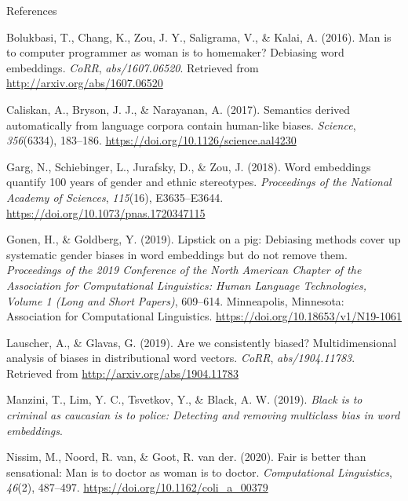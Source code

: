 \documentclass[10pt,ignorenonframetext,x11names, dvipsnames, bibspacing,natbib]{beamer}
\begin{document}
\begin{frame}{References}

\tiny

\hypertarget{refs}{}
\hypertarget{ref-Bolukbasi2016Man}{}
Bolukbasi, T., Chang, K., Zou, J. Y., Saligrama, V., \& Kalai, A.
(2016). Man is to computer programmer as woman is to homemaker?
Debiasing word embeddings. \emph{CoRR}, \emph{abs/1607.06520}. Retrieved
from \url{http://arxiv.org/abs/1607.06520}

\hypertarget{ref-Caliskan2017semanticsBiases}{}
Caliskan, A., Bryson, J. J., \& Narayanan, A. (2017). Semantics derived
automatically from language corpora contain human-like biases.
\emph{Science}, \emph{356}(6334), 183--186.
\url{https://doi.org/10.1126/science.aal4230}

\hypertarget{ref-Garg2018years}{}
Garg, N., Schiebinger, L., Jurafsky, D., \& Zou, J. (2018). Word
embeddings quantify 100 years of gender and ethnic stereotypes.
\emph{Proceedings of the National Academy of Sciences}, \emph{115}(16),
E3635--E3644. \url{https://doi.org/10.1073/pnas.1720347115}

\hypertarget{ref-Gonen2019lipstick}{}
Gonen, H., \& Goldberg, Y. (2019). Lipstick on a pig: Debiasing methods
cover up systematic gender biases in word embeddings but do not remove
them. \emph{Proceedings of the 2019 Conference of the North American
Chapter of the Association for Computational Linguistics: Human Language
Technologies, Volume 1 (Long and Short Papers)}, 609--614. Minneapolis,
Minnesota: Association for Computational Linguistics.
\url{https://doi.org/10.18653/v1/N19-1061}

\hypertarget{ref-Lauscher2019multidimensional}{}
Lauscher, A., \& Glavas, G. (2019). Are we consistently biased?
Multidimensional analysis of biases in distributional word vectors.
\emph{CoRR}, \emph{abs/1904.11783}. Retrieved from
\url{http://arxiv.org/abs/1904.11783}

\hypertarget{ref-Manzini2019blackToCriminal}{}
Manzini, T., Lim, Y. C., Tsvetkov, Y., \& Black, A. W. (2019).
\emph{Black is to criminal as caucasian is to police: Detecting and
removing multiclass bias in word embeddings}.

\hypertarget{ref-Nissim2020fair}{}
Nissim, M., Noord, R. van, \& Goot, R. van der. (2020). Fair is better
than sensational: Man is to doctor as woman is to doctor.
\emph{Computational Linguistics}, \emph{46}(2), 487--497.
\url{https://doi.org/10.1162/coli_a_00379}

\end{frame}
\end{document}
